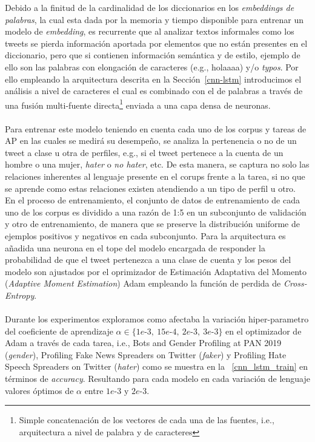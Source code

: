  	Debido a la finitud de la cardinalidad de los diccionarios en los \textit{embeddings de palabras}, la cual esta dada por la memoria y tiempo disponible para entrenar un modelo de \textit{embedding}, es recurrente que al analizar textos informales como los tweets se pierda información aportada por elementos que no están presentes en el diccionario, pero que si contienen información semántica y de estilo, ejemplo de ello son las palabras con elongación de caracteres (e.g., holaaaa) y/o \textit{typos}. Por ello empleando la arquitectura descrita en la Sección~\ref{cnn-lstm} introducimos el análisis a nivel de caracteres el cual es combinado con el de palabras a través de una fusión multi-fuente directa\footnote{Simple concatenación de los vectores de cada una de las fuentes, i.e., arquitectura a nivel de palabra y de caracteres} enviada a una capa densa de neuronas.
 	\\\\
 	Para entrenar este modelo teniendo en cuenta cada uno de los corpus y tareas de AP en las cuales se medirá su desempeño, se analiza la pertenencia o no de un tweet a clase u otra de perfiles, e.g., si el tweet pertenece a la cuenta de un hombre o una mujer, \textit{hater }o \textit{no hater}, etc. De esta manera, se captura no solo las relaciones inherentes al lenguaje presente en el corups frente a la tarea, si no que se aprende como estas relaciones existen atendiendo a un tipo de perfil u otro.
 	\\
 	En el proceso de entrenamiento, el conjunto de datos de entrenamiento de cada uno de los corpus es dividido a una razón de 1:5 en un subconjunto de validación y otro de entrenamiento, de manera que se preserve la distribución uniforme de ejemplos positivos y negativos en cada subconjunto.
 	Para la arquitectura es añadida una neurona en el tope del modelo encargada de responder la probabilidad de que el tweet pertenezca a una clase de cuenta y los pesos del modelo son ajustados por el oprimizador de Estimación Adaptativa del Momento (\textit{Adaptive Moment Estimation}) Adam \citep{DBLP:journals/corr/KingmaB14} empleando la función de perdida de \textit{Cross-Entropy}.  	\\\\
 	Durante los experimentos exploramos como afectaba la variación hiper-parametro del coeficiente de aprendizaje $\alpha \in \{1e\text{-}3,~15e\text{-}4,~2e\text{-}3,~3e\text{-}3\}$  en el optimizador de Adam a través de cada tarea, i.e., Bots and Gender Profiling at PAN 2019 (\textit{gender}), Profiling Fake News Spreaders on Twitter (\textit{faker}) y Profiling Hate Speech Spreaders on Twitter (\textit{hater}) como se muestra en la \tablename~\ref{cnn_lstm_train} en términos de \textit{accuracy}. Resultando para cada modelo en cada variación de lenguaje valores óptimos de  $\alpha$ entre $1e\text{-}3\text{ y }2e\text{-}3$.
